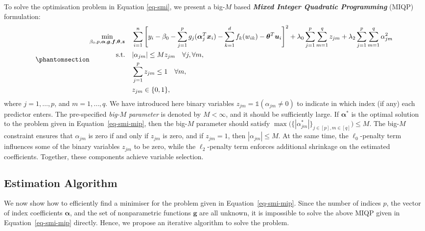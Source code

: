 \documentclass[
  11pt,
  a4paper,
]{article}
\begin{document}
To solve the optimisation problem in Equation \ref{eq-smi}, we present a
big-\(M\) based \textbf{\emph{Mixed Integer Quadratic Programming}}
(MIQP) formulation: \begin{equation}\phantomsection\label{eq-smi-mip}{
\begin{aligned}
  \min_{\beta_{0}, p, \bm{\alpha}, \bm{g}, \bm{f}, \bm{\theta}, \bm{z}} \quad & \sum_{i = 1}^{n}\Bigg [ y_{i} - \beta_{0} - \sum_{j = 1}^{p}{g_{j}(\bm{\alpha}_{j}^{T}\bm{x}_{i})} - \sum_{k = 1}^{d} {f_{k}(w_{ik})} - \bm{\theta}^{T}\bm{u}_{i}\Bigg ]^{2} + \lambda_{0}\sum_{j = 1}^{p}\sum_{m = 1}^{q}z_{jm} + \lambda_{2}\sum_{j = 1}^{p}\sum_{m = 1}^{q} \alpha_{jm}^{2} \\
  \text{s.t.} \quad & |\alpha_{jm}| \le Mz_{jm} \quad \forall j, \forall m, \\
  & \sum_{j = 1}^{p}z_{jm} \le 1 \quad \forall m, \\
  & z_{jm} \in \{0, 1\},
\end{aligned}
}\end{equation} where \(j = 1, \dots, p\), and \(m = 1, \dots, q\). We
have introduced here binary variables
\(z_{jm} = \mathbb{1}(\alpha_{jm} \neq 0)\) to indicate in which index
(if any) each predictor enters. The pre-specified \emph{big-\(M\)
parameter} is denoted by \(M < \infty\), and it should be sufficiently
large. If \(\bm{\alpha^{*}}\) is the optimal solution to the problem
given in Equation~\ref{eq-smi-mip}, then the big-\(M\) parameter should
satisfy
\(\max \big ( \{|\alpha_{jm}^{*} |\}_{j\in[p],m\in[q]} \big) \le M\).
The big-\(M\) constraint ensures that \(\alpha_{jm}\) is zero if and
only if \(z_{jm}\) is zero, and if \(z_{jm} = 1\), then
\(|\alpha_{jm}| \le M\). At the same time, the \(\ell_{0}\)-penalty term
influences some of the binary variables \(z_{jm}\) to be zero, while the
\(\ell_{2}\)-penalty term enforces additional shrinkage on the estimated
coefficients. Together, these components achieve variable selection.

\subsection{Estimation Algorithm}\label{estimation-algorithm}

We now show how to efficiently find a minimiser for the problem given in
Equation~\ref{eq-smi-mip}. Since the number of indices \(p\), the vector
of index coefficients \(\bm{\alpha}\), and the set of nonparametric
functions \(\bm{g}\) are all unknown, it is impossible to solve the
above MIQP given in Equation~\ref{eq-smi-mip} directly. Hence, we
propose an iterative algorithm to solve the problem.
\end{document}
